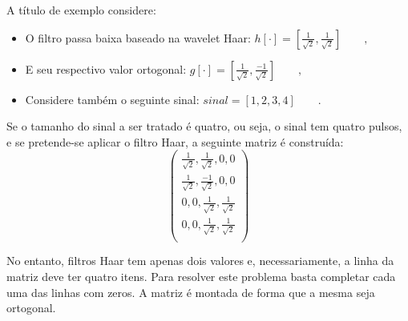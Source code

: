 \begin{myenv}{1.5}
				\par A título de exemplo considere:
				\begin{itemize}
					\item O filtro passa baixa baseado na wavelet Haar: $h[\cdot] = [\frac{1}{\sqrt{2}}, \frac{1}{\sqrt{2}}]\qquad,$
					\item E seu respectivo valor ortogonal: $g[\cdot] = [\frac{1}{\sqrt{2}}, \frac{-1}{\sqrt{2}}]\qquad,$
					\item Considere também o seguinte sinal:	$sinal = [1,2,3,4]\qquad.$
				\end{itemize}
	
				\par Se o tamanho do sinal a ser tratado é quatro, ou seja, o sinal tem quatro pulsos, e se pretende-se aplicar o filtro Haar, a seguinte matriz é construída:
				\begin{equation}
					\begin{pmatrix}
						\frac{1}{\sqrt{2}}, \frac{1}{\sqrt{2}}, 0, 0\\
						\frac{1}{\sqrt{2}}, \frac{-1}{\sqrt{2}}, 0, 0\\
						0, 0, \frac{1}{\sqrt{2}}, \frac{1}{\sqrt{2}}\\
						0, 0, \frac{1}{\sqrt{2}}, \frac{1}{\sqrt{2}}\\
						\label{eq:haarFilters}
					\end{pmatrix} 
				\end{equation}
				\par No entanto, filtros Haar tem apenas dois valores e, necessariamente, a linha da matriz deve ter quatro itens. Para resolver este problema basta completar cada uma das linhas com zeros. A matriz é montada de forma que a mesma seja ortogonal.
	

\end{myenv}

